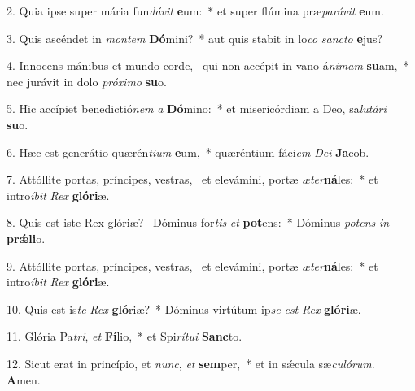 2. Quia ipse super mária fun\textit{dá}\textit{vit} \textbf{e}um:~*  et super flúmina præ\textit{pa}\textit{rá}\textit{vit} \textbf{e}um.\

3. Quis ascéndet in \textit{mon}\textit{tem} \textbf{Dó}mini?~*  aut quis stabit in lo\textit{co} \textit{sanc}\textit{to} \textbf{e}jus?\

4. Innocens mánibus et mundo corde, \dag\  qui non accépit in vano á\textit{ni}\textit{mam} \textbf{su}am,~*  nec jurávit in dolo \textit{pró}\textit{xi}\textit{mo} \textbf{su}o.\

5. Hic accípiet benedictió\textit{nem} \textit{a} \textbf{Dó}mino:~*  et misericórdiam a Deo, sa\textit{lu}\textit{tá}\textit{ri} \textbf{su}o.\

6. Hæc est generátio quærén\textit{ti}\textit{um} \textbf{e}um,~*  quæréntium fáci\textit{em} \textit{De}\textit{i} \textbf{Ja}cob.\

7. Attóllite portas, príncipes, vestras, \dag\  et elevámini, portæ \textit{æ}\textit{ter}\textbf{ná}les:~*  et intro\textit{í}\textit{bit} \textit{Rex} \textbf{gló}\textbf{ri}æ.\

8. Quis est iste Rex glóriæ? \dag\  Dóminus for\textit{tis} \textit{et} \textbf{pot}ens:~*  Dóminus \textit{pot}\textit{ens} \textit{in} \textbf{prǽ}\textbf{li}o.\

9. Attóllite portas, príncipes, vestras, \dag\  et elevámini, portæ \textit{æ}\textit{ter}\textbf{ná}les:~*  et intro\textit{í}\textit{bit} \textit{Rex} \textbf{gló}\textbf{ri}æ.\

10. Quis est is\textit{te} \textit{Rex} \textbf{gló}riæ?~*  Dóminus virtútum ip\textit{se} \textit{est} \textit{Rex} \textbf{gló}\textbf{ri}æ.\

11. Glória Pa\textit{tri}, \textit{et} \textbf{Fí}lio,~*  et Spi\textit{rí}\textit{tu}\textit{i} \textbf{Sanc}to.\

12. Sicut erat in princípio, et \textit{nunc}, \textit{et} \textbf{sem}per,~*  et in sǽcula sæ\textit{cu}\textit{ló}\textit{rum}. \textbf{A}men.\


